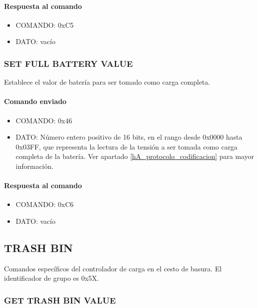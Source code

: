 \paragraph*{Respuesta al comando}

\begin{itemize}
	\item{COMANDO:} 0xC5
	\item{DATO:} vac\'io
\end{itemize}

\subsubsection{SET FULL BATTERY VALUE}
\label{hA_protocolo_set_battery_empty_value}

Establece el valor de bater\'ia para ser tomado como carga completa.

\paragraph*{Comando enviado}

\begin{itemize}
	\item{COMANDO:} 0x46
	\item{DATO:} N\'umero entero positivo de 16 bits, en el rango desde 0x0000 hasta 0x03FF,
		que representa la lectura de la tensi\'on a ser tomada como carga completa de la bater\'ia.
		Ver apartado \ref{hA_protocolo_codificacion} para mayor informaci\'on.
\end{itemize}

\paragraph*{Respuesta al comando}

\begin{itemize}
	\item{COMANDO:} 0xC6
	\item{DATO:} vac\'io
\end{itemize}

\subsection{TRASH BIN}
\label{hA_protocolo_grupo_trash_bin}

Comandos espec\'ificos del controlador de carga en el cesto de basura.
El identificador de grupo es 0x5X.

\subsubsection{GET TRASH BIN VALUE}
\label{hA_protocolo_get_trash_bin_value}

